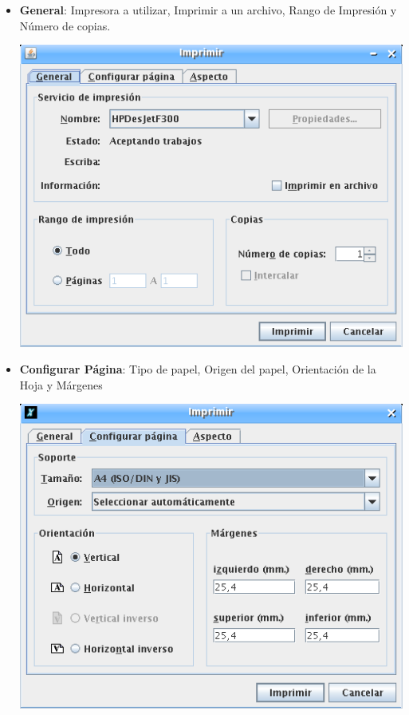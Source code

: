 \begin{itemize}
   \item \textbf{General}: Impresora a utilizar, Imprimir a un archivo, Rango
      de Impresi\'on y N\'umero de copias.
      \begin{center}
         \includegraphics[scale=0.3]{Imagenes/02_Caracteristicas/VentanaImpresion_01.png}
      \end{center}
   \item \textbf{Configurar P\'agina}: Tipo de papel, Origen del papel,
      Orientaci\'on de la Hoja y M\'argenes
      \begin{center}
         \includegraphics[scale=0.3]{Imagenes/02_Caracteristicas/VentanaImpresion_02.png}

\end{center}
\end{itemize}
